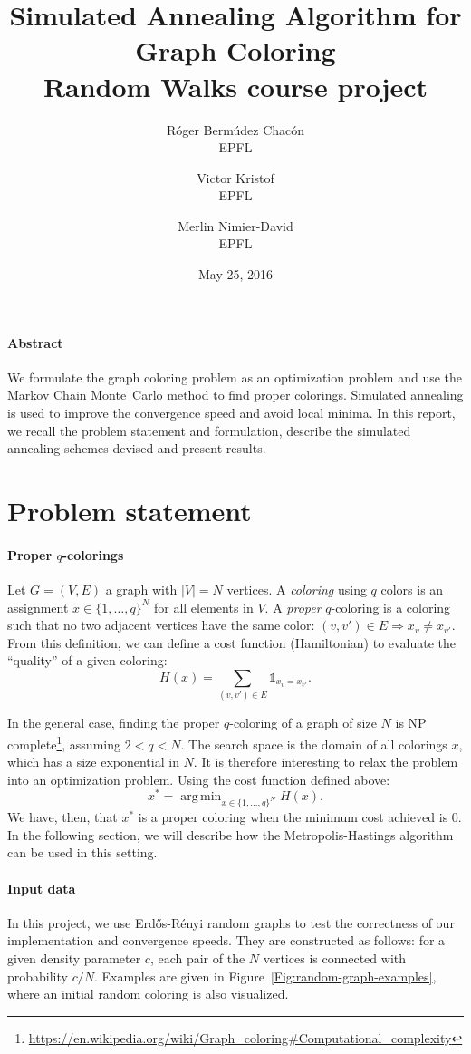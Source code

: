 \documentclass{article}
\title{Simulated Annealing Algorithm for Graph Coloring\\Random Walks course project}
\date{May 25, 2016}
\author{
  R\'oger Berm\'udez Chac\'on\\EPFL
  \and
  Victor Kristof\\EPFL
  \and
  Merlin Nimier-David\\EPFL
}
\DeclareMathOperator*{\argmin}{arg\,min}
\begin{document}
  \maketitle

  \paragraph{Abstract}
  We formulate the graph coloring problem as an optimization problem and use the Markov Chain Monte~Carlo method to find proper colorings. Simulated annealing is used to improve the convergence speed and avoid local minima. In this report, we recall the problem statement and formulation, describe the simulated annealing schemes devised and present results.

  \section*{Problem statement}
  \paragraph{Proper $q$-colorings}
  Let $G = (V, E)$ a graph with $|V| = N$ vertices. A \emph{coloring} using $q$ colors is an assignment $x \in \{ 1, \ldots, q \}^N$ for all elements in $V$. A \emph{proper} $q$-coloring is a coloring such that no two adjacent vertices have the same color: $(v, v') \in E \Rightarrow x_v \neq x_{v'}$. From this definition, we can define a cost function (Hamiltonian) to evaluate the ``quality'' of a given coloring:
  \[
    H(x) = \sum_{(v, v') \in E} \mathbb{1}_{x_v = x_{v'}}.
  \]

  In the general case, finding the proper $q$-coloring of a graph of size $N$ is NP complete\footnote{\url{https://en.wikipedia.org/wiki/Graph_coloring\#Computational_complexity}}, assuming $2 < q < N$. The search space is the domain of all colorings $x$, which has a size exponential in $N$. It is therefore interesting to relax the problem into an optimization problem. Using the cost function defined above:
  \[
    x^* = \argmin_{x \in \{ 1, \ldots, q \}^N} H(x).
  \]
  We have, then, that $x^*$ is a proper coloring when the minimum cost achieved is $0$. In the following section, we will describe how the Metropolis-Hastings algorithm can be used in this setting.

  \paragraph{Input data}
  In this project, we use Erd\H{o}s-R\'{e}nyi random graphs to test the correctness of our implementation and convergence speeds. They are constructed as follows: for a given density parameter $c$, each pair of the $N$ vertices is connected with probability $c / N$. Examples are given in Figure~\ref{Fig:random-graph-examples}, where an initial random coloring is also visualized.
\end{document}
